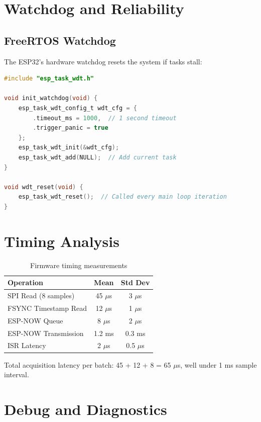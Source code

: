 \section{Watchdog and Reliability}

\subsection{FreeRTOS Watchdog}

The ESP32's hardware watchdog resets the system if tasks stall:

\begin{lstlisting}[language=c]
#include "esp_task_wdt.h"

void init_watchdog(void) {
    esp_task_wdt_config_t wdt_cfg = {
        .timeout_ms = 1000,  // 1 second timeout
        .trigger_panic = true
    };
    esp_task_wdt_init(&wdt_cfg);
    esp_task_wdt_add(NULL);  // Add current task
}

void wdt_reset(void) {
    esp_task_wdt_reset();  // Called every main loop iteration
}
\end{lstlisting}

\section{Timing Analysis}

\begin{table}[h]
    \centering
    \caption{Firmware timing measurements}
    \label{tab:firmware_timing}
    \begin{tabular}{lcc}
        \toprule
        \textbf{Operation} & \textbf{Mean} & \textbf{Std Dev} \\
        \midrule
        SPI Read (8 samples) & 45 $\mu$s & 3 $\mu$s \\
        FSYNC Timestamp Read & 12 $\mu$s & 1 $\mu$s \\
        ESP-NOW Queue & 8 $\mu$s & 2 $\mu$s \\
        ESP-NOW Transmission & 1.2 ms & 0.3 ms \\
        ISR Latency & 2 $\mu$s & 0.5 $\mu$s \\
        \bottomrule
    \end{tabular}
\end{table}

Total acquisition latency per batch: 45 + 12 + 8 = 65 $\mu$s, well under 1 ms sample interval.

\section{Debug and Diagnostics}

